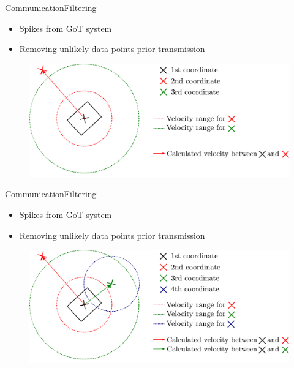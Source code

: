\begin{frame}{Communication}{Filtering}
  \begin{itemize}
    \item Spikes from GoT system
    \item Removing unlikely data points prior transmission
  \end{itemize}
  
  \begin{figure}
  	\includegraphics[scale = .5]{Pictures/comFilter3.pdf}
  \end{figure}
  
\end{frame}
\begin{frame}{Communication}{Filtering}
  \begin{itemize}
    \item Spikes from GoT system
    \item Removing unlikely data points prior transmission
  \end{itemize}
  
  \begin{figure}
  	\includegraphics[scale = .5]{Pictures/comFilter4.pdf}
  \end{figure}
  
\end{frame}
